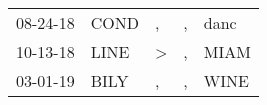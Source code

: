 \begin{supertabular}{lllll}
 08-24-18 &  COND &             , &  , &  danc \\
 10-13-18 &  LINE &  \textgreater &  , &  MIAM \\
 03-01-19 &  BILY &             , &  , &  WINE \\
\end{supertabular}
